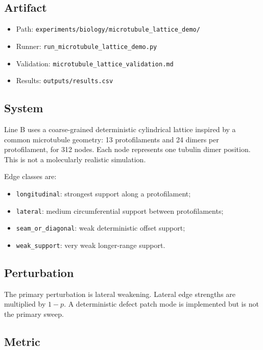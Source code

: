 \documentclass[11pt]{article}
\begin{document}
\subsection{Artifact}

\begin{itemize}
\item Path: \texttt{experiments/biology/microtubule\_lattice\_demo/}
\item Runner: \texttt{run\_microtubule\_lattice\_demo.py}
\item Validation: \texttt{microtubule\_lattice\_validation.md}
\item Results: \texttt{outputs/results.csv}
\end{itemize}

\subsection{System}

Line B uses a coarse-grained deterministic cylindrical lattice inspired by a common microtubule geometry: 13 protofilaments and 24 dimers per protofilament, for 312 nodes. Each node represents one tubulin dimer position. This is not a molecularly realistic simulation.

Edge classes are:

\begin{itemize}
\item \texttt{longitudinal}: strongest support along a protofilament;
\item \texttt{lateral}: medium circumferential support between protofilaments;
\item \texttt{seam\_or\_diagonal}: weak deterministic offset support;
\item \texttt{weak\_support}: very weak longer-range support.
\end{itemize}

\subsection{Perturbation}

The primary perturbation is lateral weakening. Lateral edge strengths are multiplied by \(1-p\). A deterministic defect patch mode is implemented but is not the primary sweep.

\subsection{Metric}
\end{document}

